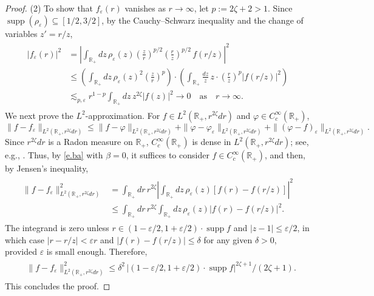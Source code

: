 \documentclass[12pt,reqno]{amsart}
\theoremstyle{definition}
\theoremstyle{remark}
\numberwithin{equation}{section}
\newcommand{\1}{\mathbbm{1}}
\renewcommand{\epsilon}{\varepsilon}
\renewcommand{\phi}{\varphi}
\newcommand{\R}{\mathbb{R}}
\DeclareMathOperator{\dist}{dist}
\DeclareMathOperator{\supp}{supp}
\def\cn{\mathcal{N}}
\begin{document}
\begin{proof}
  (2) To show that $f_\epsilon(r)$ vanishes as $r\to \infty$, let $p := 2\zeta+2>1$. 
  Since $\supp(\rho_\epsilon) \subseteq [1/2, 3/2]$, by the Cauchy--Schwarz inequality and the change of variables $z' = r/z$,
  \begin{align}
    \begin{split}
      |f_\epsilon(r)|^2
      & = \left|\int_{\R_+} dz\, \rho_\epsilon(z)\left(\frac{z}{r}\right)^{p/2} \left(\frac{r}{z}\right)^{p/2} \, f(r/z) \right|^2 \\
      & \leq \left(\int_{\R_+} dz\, \rho_\epsilon(z)^2\left(\frac{z}{r}\right)^p\right) \cdot \left(\int_{\R_+}\frac{dz}{z}\, z\cdot\left(\frac{r}{z}\right)^p|f(r/z)|^2\right) \\
      & \lesssim_{p,\epsilon} r^{1-p} \int_{\R_+} dz\, z^{2\zeta} |f(z)|^2\to 0 \quad \mbox{as}\quad r\to\infty.
    \end{split}
  \end{align}
  We next prove the $L^2$-approximation. For 
  $f\in L^2(\R_+,r^{2\zeta}dr)$ and $\phi\in C_c^\infty(\R_+)$, 
  $$
  \|f-f_\epsilon\|_{L^2(\R_+,r^{2\zeta}dr)}\le 
  \|f-\phi\|_{L^2(\R_+,r^{2\zeta}dr)}+\|\phi-\phi_\epsilon\|_{L^2(\R_+,r^{2\zeta}dr)}+
  \|(\phi-f)_\epsilon\|_{L^2(\R_+,r^{2\zeta}dr)}.
  $$
  Since $r^{2\zeta}dr$ is a Radon measure on $\R_+$, $C_c^\infty(\R_+)$ is dense in $L^2(\R_+,r^{2\zeta}dr)$; see, e.g., \cite[pp.~189--190]{Schilling2017}. Thus, by \eqref{e.ba} with $\beta=0$, it suffices to consider $f\in C_c^\infty(\R_+)$, and then, by Jensen's inequality,
  \begin{align}
    \begin{split}
      \|f-f_\epsilon\|_{L^2(\R_+,r^{2\zeta}dr)}^2
      & = \int_{\R_+}dr\, r^{2\zeta}\left|\int_{\R_+}dz\, \rho_\epsilon(z)[f(r)-f(r/z)]\right|^2 \\
      & \leq \int_{\R_+}dr\, r^{2\zeta}\int_{\R_+}dz\, \rho_\epsilon(z)|f(r)-f(r/z)|^2.\nonumber
    \end{split}
  \end{align}
  The integrand is zero unless $r\in (1-\epsilon/2,1+\epsilon/2)\cdot \supp f$ and $|z-1|\leq\epsilon/2$, in which case $|r-r/z|<\epsilon r$ and $|f(r)-f(r/z)|\leq \delta$ for any given $\delta>0$, provided $\epsilon$ is small enough.
  Therefore, 
  \begin{align}
    \begin{split}
      & \|f-f_\epsilon\|_{L^2(\R_+,r^{2\zeta}dr)}^2
      \le\delta^2 \, |(1-\epsilon/2,1+\epsilon/2)\cdot \supp f|^{2\zeta+1}/(2\zeta+1).\nonumber
    \end{split}
  \end{align}
  This concludes the proof.
\end{proof}
\end{document}
